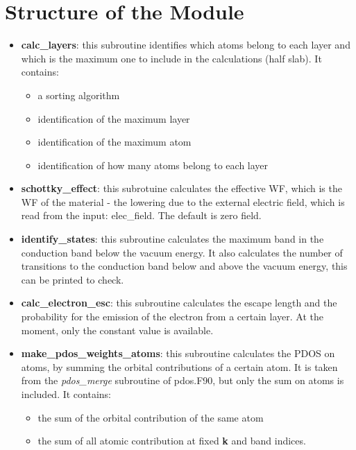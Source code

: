 \documentclass[a4paper,11pt,twoside]{book}
\begin{document}
\chapter{Structure of the Module} \label{sec:structure}
\begin{itemize}
\item  {\bf calc\_layers}: this subroutine identifies which atoms
belong to each layer and which is the maximum one to include in the calculations (half slab).
It contains:
       \begin{itemize}
       \item a sorting algorithm
       \item identification of the maximum layer
       \item identification of the maximum atom
       \item identification of how many atoms belong to each layer
       \end{itemize}

\item  {\bf schottky\_effect}: this subrotuine calculates
	the effective WF, which is the WF of the material -
	the lowering due to the external electric field,
	which is read from the input: elec\_field.
	The default is zero field.
\item  {\bf identify\_states}: this subroutine calculates the
       maximum band in the conduction band below the vacuum energy.
       It also calculates the number of transitions to the
       conduction band below and above the vacuum energy,
       this can be printed to check.
\item  {\bf calc\_electron\_esc}: this subroutine calculates the
	escape length and the probability
	for the emission of the electron from
	a certain layer.
	At the moment, only the constant value is
	available.

\item  {\bf make\_pdos\_weights\_atoms}: this subroutine calculates the
PDOS on atoms, by summing the orbital contributions
of a certain atom. It is taken from the {\it pdos\_merge} subroutine of
pdos.F90, but only the sum on atoms is included.
It contains:
       \begin{itemize}
       \item the sum of the orbital contribution of the same atom
       \item the sum of all atomic contribution at fixed {\bf k}
and band indices.
       \end{itemize}


\end{itemize}
\end{document}
